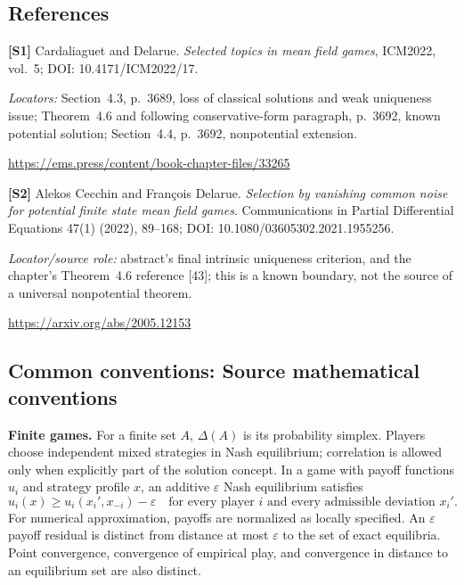 \documentclass[11pt,a4paper]{article}
\begin{document}
\subsection*{References}
\begingroup\footnotesize\raggedright
{\footnotesize\raggedright
\textbf{[S1]} Cardaliaguet and Delarue. \emph{Selected topics in mean field games}, ICM2022, vol.~5; DOI: 10.4171/ICM2022/17.\par
\textit{Locators:} Section~4.3, p.~3689, loss of classical solutions and weak uniqueness issue; Theorem~4.6 and following conservative-form paragraph, p.~3692, known potential solution; Section~4.4, p.~3692, nonpotential extension.\par
\url{https://ems.press/content/book-chapter-files/33265}\par\smallskip
\textbf{[S2]} Alekos Cecchin and Fran\c{c}ois Delarue. \emph{Selection by vanishing common noise for potential finite state mean field games}. Communications in Partial Differential Equations 47(1) (2022), 89--168; DOI: 10.1080/03605302.2021.1955256.\par
\textit{Locator/source role:} abstract's final intrinsic uniqueness criterion, and the chapter's Theorem~4.6 reference [43]; this is a known boundary, not the source of a universal nonpotential theorem.\par
\url{https://arxiv.org/abs/2005.12153}\par}
\par\endgroup

\subsection*{Common conventions: Source mathematical conventions}

\textbf{Finite games.} For a finite set $A$, $\Delta(A)$ is its probability
simplex. Players choose independent mixed strategies in Nash equilibrium;
correlation is allowed only when explicitly part of the solution concept.
In a game with payoff functions $u_i$ and strategy profile $x$, an additive
$\varepsilon$ Nash equilibrium satisfies
\[
 u_i(x)\geq u_i(x_i',x_{-i})-\varepsilon
 \quad\text{for every player $i$ and every admissible deviation $x_i'$}.
\]
For numerical approximation, payoffs are normalized as locally specified.
An $\varepsilon$ payoff residual is distinct from distance at most
$\varepsilon$ to the set of exact equilibria. Point convergence, convergence
of empirical play, and convergence in distance to an equilibrium set are
also distinct.
\end{document}
